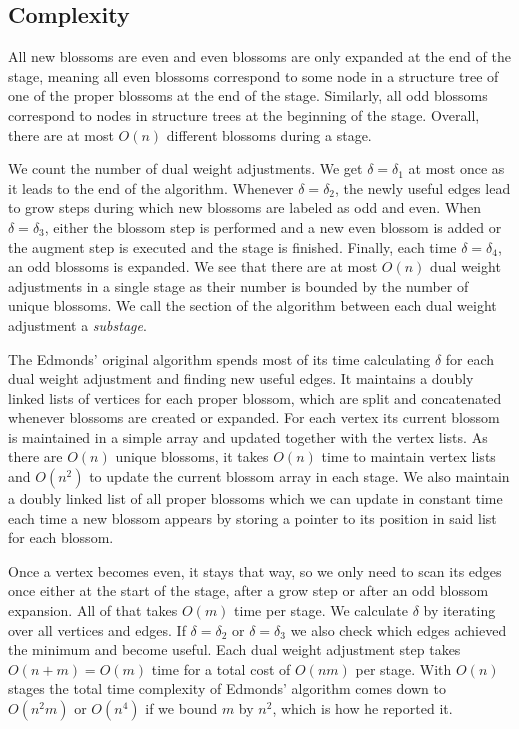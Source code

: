 \subsection{Complexity}

All new blossoms are even and even blossoms are only expanded at the end of the stage, meaning all even blossoms correspond to some node in a structure tree of one of the proper blossoms at the end of the stage. Similarly, all odd blossoms correspond to nodes in structure trees at the beginning of the stage. Overall, there are at most $O(n)$ different blossoms during a stage. 

We count the number of dual weight adjustments. We get $\delta = \delta_1$ at most once as it leads to the end of the algorithm. Whenever $\delta = \delta_2$, the newly useful edges lead to grow steps during which new blossoms are labeled as odd and even. When $\delta = \delta_3$, either the blossom step is performed and a new even blossom is added or the augment step is executed and the stage is finished. Finally, each time $\delta = \delta_4$, an odd blossoms is expanded. We see that there are at most $O(n)$ dual weight adjustments in a single stage as their number is bounded by the number of unique blossoms. We call the section of the algorithm between each dual weight adjustment a \textit{substage}.

The Edmonds' original algorithm spends most of its time calculating $\delta$ for each dual weight adjustment and finding new useful edges. It maintains a doubly linked lists of vertices for each proper blossom, which are split and concatenated whenever blossoms are created or expanded. For each vertex its current blossom is maintained in a simple array and updated together with the vertex lists. As there are $O(n)$ unique blossoms, it takes $O(n)$ time to maintain vertex lists and $O(n^2)$ to update the current blossom array in each stage. We also maintain a doubly linked list of all proper blossoms which we can update in constant time each time a new blossom appears by storing a pointer to its position in said list for each blossom.

Once a vertex becomes even, it stays that way, so we only need to scan its edges once either at the start of the stage, after a grow step or after an odd blossom expansion. All of that takes $O(m)$ time per stage. We calculate $\delta$ by iterating over all vertices and edges. If $\delta = \delta_2$ or $\delta = \delta_3$ we also check which edges achieved the minimum and become useful. Each dual weight adjustment step takes $O(n+m)=O(m)$ time for a total cost of $O(nm)$ per stage. With $O(n)$ stages the total time complexity of Edmonds' algorithm comes down to $O(n^2m)$ or $O(n^4)$ if we bound $m$ by $n^2$, which is how he reported it.

